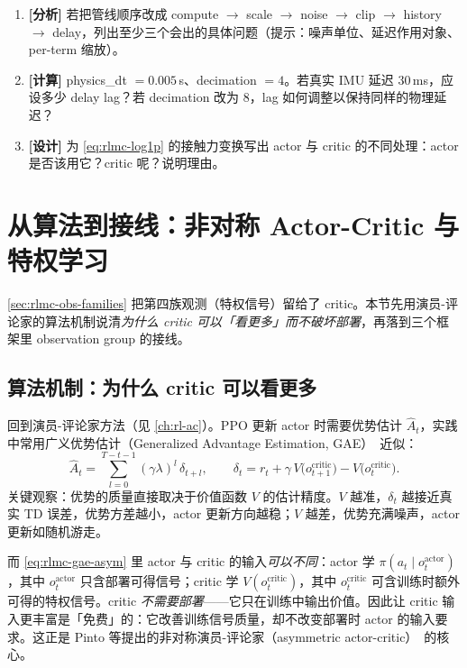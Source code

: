 \begin{practice}[练习·处理管线]
\begin{enumerate}
  \item \textbf{[分析]} 若把管线顺序改成 compute $\to$ scale $\to$ noise $\to$ clip $\to$ history $\to$ delay，列出至少三个会出的具体问题（提示：噪声单位、延迟作用对象、per-term 缩放）。
  \item \textbf{[计算]} physics\_dt $=0.005\,$s、decimation $=4$。若真实 IMU 延迟 $30\,$ms，应设多少 delay lag？若 decimation 改为 $8$，lag 如何调整以保持同样的物理延迟？
  \item \textbf{[设计]} 为 \cref{eq:rlmc-log1p} 的接触力变换写出 actor 与 critic 的不同处理：actor 是否该用它？critic 呢？说明理由。
\end{enumerate}
\end{practice}

\section{从算法到接线：非对称 Actor-Critic 与特权学习}
\label{sec:rlmc-asymmetric}

\cref{sec:rlmc-obs-families} 把第四族观测（特权信号）留给了 critic。本节先用演员-评论家的算法机制说清\emph{为什么 critic 可以「看更多」而不破坏部署}，再落到三个框架里 observation group 的接线。

\subsection{算法机制：为什么 critic 可以看更多}
\label{sec:rlmc-why-asymmetric}

回到演员-评论家方法（见 \cref{ch:rl-ac}）。PPO 更新 actor 时需要优势估计 $\hat A_t$，实践中常用广义优势估计（Generalized Advantage Estimation, GAE）\,\cite{schulman2016gae} 近似：
\begin{equation}
\hat A_t = \sum_{l=0}^{T-t-1}(\gamma\lambda)^l\,\delta_{t+l},
\qquad
\delta_t = r_t + \gamma\,V\!\big(o^{\text{critic}}_{t+1}\big) - V\!\big(o^{\text{critic}}_t\big).
\label{eq:rlmc-gae-asym}
\end{equation}
关键观察：优势的质量直接取决于价值函数 $V$ 的估计精度。$V$ 越准，$\delta_t$ 越接近真实 TD 误差，优势方差越小，actor 更新方向越稳；$V$ 越差，优势充满噪声，actor 更新如随机游走。

而 \cref{eq:rlmc-gae-asym} 里 actor 与 critic 的输入\emph{可以不同}：actor 学 $\pi(a_t\mid o^{\text{actor}}_t)$，其中 $o^{\text{actor}}_t$ 只含部署可得信号；critic 学 $V(o^{\text{critic}}_t)$，其中 $o^{\text{critic}}_t$ 可含训练时额外可得的特权信号。critic \emph{不需要部署}——它只在训练中输出价值。因此让 critic 输入更丰富是「免费」的：它改善训练信号质量，却不改变部署时 actor 的输入要求。这正是 Pinto 等提出的非对称演员-评论家（asymmetric actor-critic）\,\cite{pinto2018asymmetric} 的核心。

